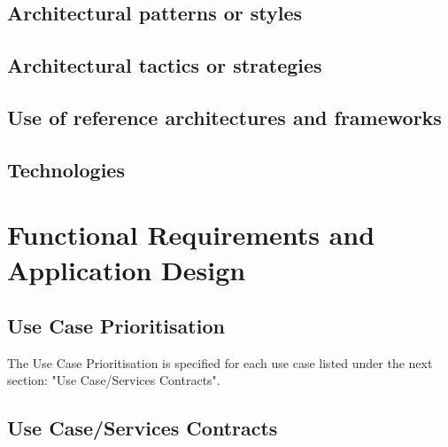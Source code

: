 \documentclass[a4paper,12pt]{article}
\begin{document}
\newpage
\subsection{Architectural patterns or styles}

\newpage
\subsection{Architectural tactics or strategies}

\newpage
\subsection{Use of reference architectures and frameworks}

\newpage
\subsection{Technologies}

\newpage
\section{Functional Requirements and Application Design}
\subsection{Use Case Prioritisation}
The Use Case Prioritisation is specified for each use case listed under the next section: "Use Case/Services Contracts".
\subsection{Use Case/Services Contracts}
\end{document}
